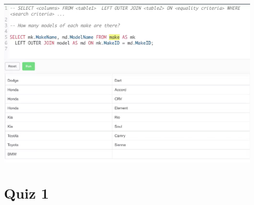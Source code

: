 \documentclass[12pt]{article}
\begin{document}
\begin{itemize}
\begin{itemize}
        \begin{center}
        \includegraphics[width=\linewidth]{images/part_4_notes_8.png}
        \end{center}


    \end{itemize}
\end{itemize}

\bigskip

\section{Quiz 1}

\bigskip
\end{document}
